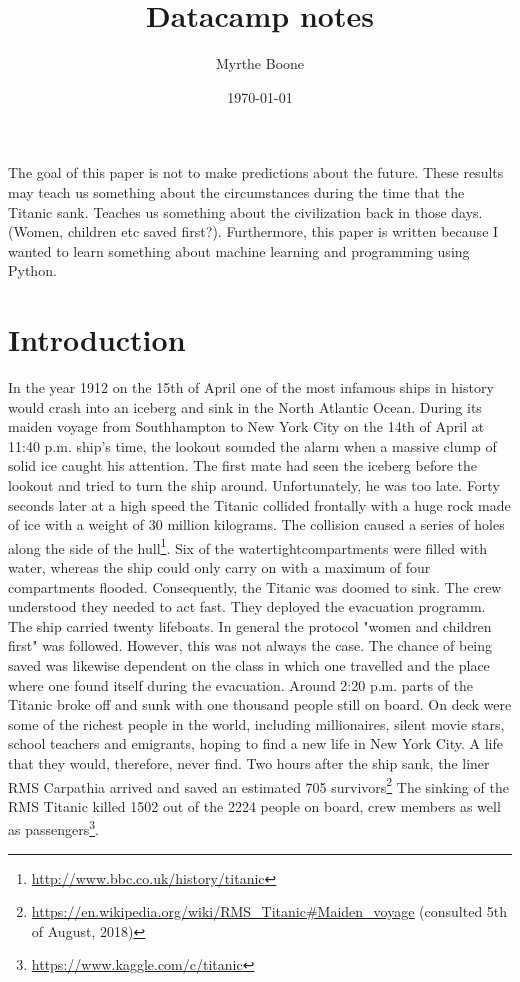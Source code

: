 \documentclass[11pt]{article}
\author{Myrthe Boone}
\date{\today}
\title{Datacamp notes}
\begin{document}
\tableofcontents

The goal of this paper is not to make predictions about the future. These results may teach us something about the circumstances during the time that the Titanic sank. Teaches us something about the civilization back in those days. (Women, children etc saved first?). Furthermore, this paper is written because I wanted to learn something about machine learning and programming using Python. 

\section{Introduction}
\label{sec:orgb13ee37}
In the year 1912 on the 15th of April one of the most infamous ships in history would crash into an iceberg and sink in the North Atlantic Ocean. During its maiden voyage from Southhampton to New York City on the 14th of April at 11:40 p.m. ship's time, the lookout sounded the alarm  when a massive clump of solid ice caught his attention. The first mate had seen the iceberg before the lookout and tried to turn the ship around. Unfortunately, he was too late. Forty seconds later at a high speed the Titanic collided frontally with a huge rock made of ice with a weight of 30 million kilograms. The collision caused a series of holes along the side of the hull\footnote{\url{http://www.bbc.co.uk/history/titanic}}. Six of the watertightcompartments were filled with water, whereas the ship could only carry on with a maximum of four compartments flooded. Consequently, the Titanic was doomed to sink. The crew understood they needed to act fast. They deployed the evacuation programm. The ship carried twenty lifeboats. In general the protocol "women and children first" was followed. However, this was not always the case. The chance of being saved was likewise dependent on the class in which one travelled and the place where one found itself during the evacuation. Around 2:20 p.m. parts of the Titanic broke off and sunk with one thousand people still on board. On deck were some of the richest people in the world, including millionaires, silent movie stars, school teachers and emigrants, hoping to find a new life in New York City. A life that they would, therefore, never find. Two hours after the ship sank, the liner RMS Carpathia arrived and saved an estimated 705 survivors\footnote{\url{https://en.wikipedia.org/wiki/RMS\_Titanic\#Maiden\_voyage} (consulted 5th of August, 2018)} The sinking of the RMS Titanic killed 1502 out of the 2224 people on board, crew members as well as passengers\footnote{\url{https://www.kaggle.com/c/titanic}}.
\end{document}
